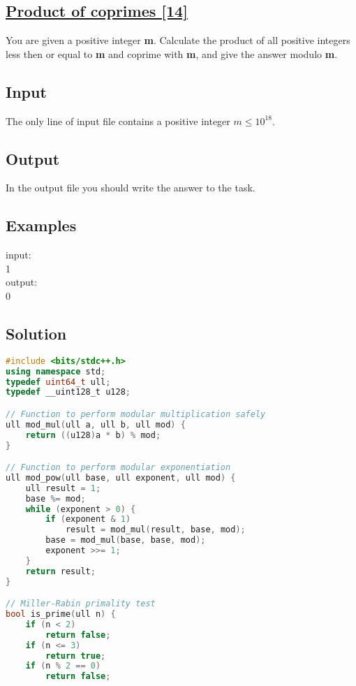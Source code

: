 \documentclass[10pt,a4paper]{article}
\begin{document}
\begin{itemize}
\subsection*{\href{https://basecamp.eolymp.com/en/problems/647}{\underline{Product of coprimes [14]}}}
You are given a positive integer \textbf{m}. Calculate the product of all positive integers less then or equal to \textbf{m} and coprime with \textbf{m}, and give the answer modulo \textbf{m}.
\subsection*{Input}
The only line of input file contains a positive integer $m \leq 10^{18}$.

\subsection*{Output}
In the output file you should write the answer to the task.

\subsection*{Examples}
input: \\
1\\
output: \\
0

\subsection*{Solution}
\begin{lstlisting}[language=C++, caption={Product of coprimes}, label={1st:code}, mathescape=true, breaklines=true]
#include <bits/stdc++.h>    
using namespace std;
typedef uint64_t ull;
typedef __uint128_t u128;

// Function to perform modular multiplication safely
ull mod_mul(ull a, ull b, ull mod) {
    return ((u128)a * b) % mod;
}

// Function to perform modular exponentiation
ull mod_pow(ull base, ull exponent, ull mod) {
    ull result = 1;
    base %= mod;
    while (exponent > 0) {
        if (exponent & 1)
            result = mod_mul(result, base, mod);
        base = mod_mul(base, base, mod);
        exponent >>= 1;
    }
    return result;
}

// Miller-Rabin primality test
bool is_prime(ull n) {
    if (n < 2)
        return false;
    if (n <= 3)
        return true;
    if (n % 2 == 0)
        return false;


\end{lstlisting}
\end{itemize}
\end{document}
